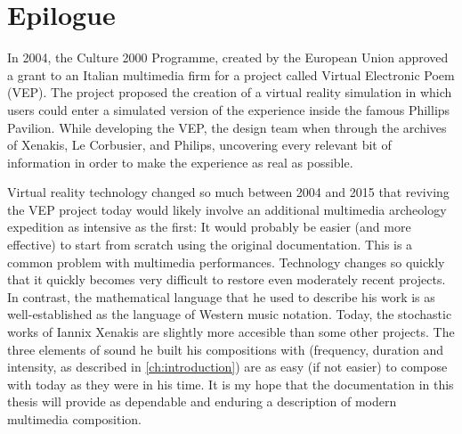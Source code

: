 \clearpage
\chapter*{Epilogue}
\label{ch:epilogue}

In 2004, the Culture 2000 Programme, created by the European Union
approved a grant to an Italian multimedia firm for a project called
Virtual Electronic Poem (VEP).\cite{eu2004} The project proposed the
creation of a virtual reality simulation in which users could enter a
simulated version of the experience inside the famous Phillips
Pavilion. While developing the VEP, the design team when through the
archives of Xenakis, Le Corbusier, and Philips, uncovering every
relevant bit of information in order to make the experience as real as
possible.\cite{Lombardo2009} 

Virtual reality technology changed so much between 2004 and 2015 that
reviving the VEP project today would likely involve an additional
multimedia archeology expedition as intensive as the first: It would
probably be easier (and more effective) to start from scratch using
the original documentation. This is a common problem with multimedia
performances. Technology changes so quickly that it quickly becomes
very difficult to restore even moderately recent
projects.\cite{Lombardo2006} In contrast, the mathematical language
that he used to describe his work is as well-established as the
language of Western music notation. Today, the stochastic works
of Iannix Xenakis are slightly more accesible than some other
projects. The three elements of sound he built his compositions with
(frequency, duration and intensity, as described in
\autoref{ch:introduction}) are as easy (if not easier) to compose with
today as they were in his time. It is my hope that the documentation
in this thesis will provide as dependable and enduring a description
of modern multimedia composition.





